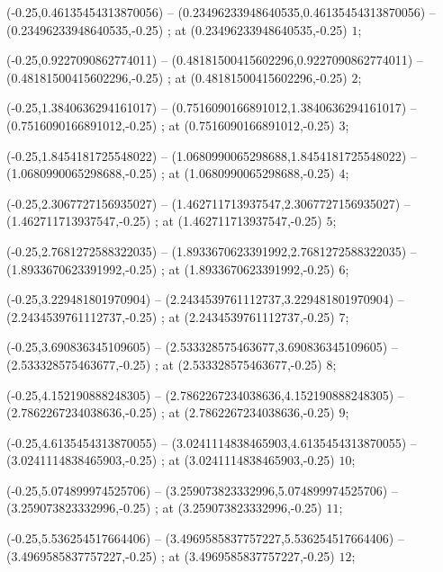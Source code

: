 (-0.25,0.46135454313870056) --
(0.23496233948640535,0.46135454313870056) --
(0.23496233948640535,-0.25)
;
 at (0.23496233948640535,-0.25) {\tiny{$1$}};

(-0.25,0.9227090862774011) --
(0.48181500415602296,0.9227090862774011) --
(0.48181500415602296,-0.25)
;
 at (0.48181500415602296,-0.25) {\tiny{$2$}};

(-0.25,1.3840636294161017) --
(0.7516090166891012,1.3840636294161017) --
(0.7516090166891012,-0.25)
;
 at (0.7516090166891012,-0.25) {\tiny{$3$}};

(-0.25,1.8454181725548022) --
(1.0680990065298688,1.8454181725548022) --
(1.0680990065298688,-0.25)
;
 at (1.0680990065298688,-0.25) {\tiny{$4$}};

(-0.25,2.3067727156935027) --
(1.462711713937547,2.3067727156935027) --
(1.462711713937547,-0.25)
;
 at (1.462711713937547,-0.25) {\tiny{$5$}};

(-0.25,2.7681272588322035) --
(1.8933670623391992,2.7681272588322035) --
(1.8933670623391992,-0.25)
;
 at (1.8933670623391992,-0.25) {\tiny{$6$}};

(-0.25,3.229481801970904) --
(2.2434539761112737,3.229481801970904) --
(2.2434539761112737,-0.25)
;
 at (2.2434539761112737,-0.25) {\tiny{$7$}};

(-0.25,3.690836345109605) --
(2.533328575463677,3.690836345109605) --
(2.533328575463677,-0.25)
;
 at (2.533328575463677,-0.25) {\tiny{$8$}};

(-0.25,4.152190888248305) --
(2.7862267234038636,4.152190888248305) --
(2.7862267234038636,-0.25)
;
 at (2.7862267234038636,-0.25) {\tiny{$9$}};

(-0.25,4.6135454313870055) --
(3.0241114838465903,4.6135454313870055) --
(3.0241114838465903,-0.25)
;
 at (3.0241114838465903,-0.25) {\tiny{$10$}};

(-0.25,5.074899974525706) --
(3.259073823332996,5.074899974525706) --
(3.259073823332996,-0.25)
;
 at (3.259073823332996,-0.25) {\tiny{$11$}};

(-0.25,5.536254517664406) --
(3.4969585837757227,5.536254517664406) --
(3.4969585837757227,-0.25)
;
 at (3.4969585837757227,-0.25) {\tiny{$12$}};

